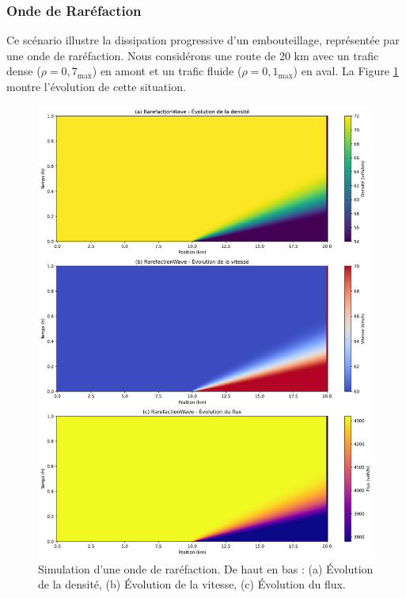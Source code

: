 \subsubsection{Onde de Raréfaction}
\label{subsubsec:rarefaction_sim}

Ce scénario illustre la dissipation progressive d'un embouteillage, représentée par une onde de raréfaction. Nous considérons une route de 20 km avec un trafic dense ($\rho = 0,7$\rho$_{\max}$) en amont et un trafic fluide ($\rho = 0,1$\rho$_{\max}$) en aval. La Figure \ref{fig:sim_rarefaction} montre l'évolution de cette situation.

\begin{figure}[htbp]
\centering
\includegraphics[width=1.0\textwidth]{simulations/LWR/rarefaction/RarefactionWave_combined}
\caption{Simulation d'une onde de raréfaction. De haut en bas : (a) Évolution de la densité, (b) Évolution de la vitesse, (c) Évolution du flux.}
\label{fig:sim_rarefaction}
\end{figure}


